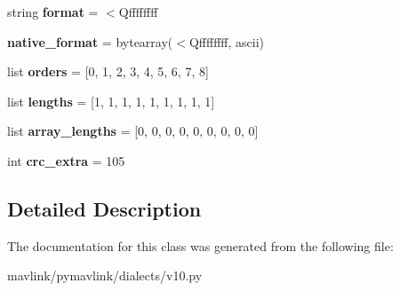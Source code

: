 \begin{DoxyCompactItemize}
\mbox{\label{classpymavlink_1_1dialects_1_1v10_1_1MAVLink__wind__cov__message_a94e3a05002052bcd2541877545a1d447}} 
string {\bfseries format} = \textquotesingle{}$<$Qffffffff\textquotesingle{}
\item 
\mbox{\label{classpymavlink_1_1dialects_1_1v10_1_1MAVLink__wind__cov__message_a9d62081563a8bb545bb20d6b3fa200c0}} 
{\bfseries native\+\_\+format} = bytearray(\textquotesingle{}$<$Qffffffff\textquotesingle{}, \textquotesingle{}ascii\textquotesingle{})
\item 
\mbox{\label{classpymavlink_1_1dialects_1_1v10_1_1MAVLink__wind__cov__message_a04a3cf70e7bc67df400119710d004f37}} 
list {\bfseries orders} = \mbox{[}0, 1, 2, 3, 4, 5, 6, 7, 8\mbox{]}
\item 
\mbox{\label{classpymavlink_1_1dialects_1_1v10_1_1MAVLink__wind__cov__message_a970d2b71e520a8302693309f84ca39b8}} 
list {\bfseries lengths} = \mbox{[}1, 1, 1, 1, 1, 1, 1, 1, 1\mbox{]}
\item 
\mbox{\label{classpymavlink_1_1dialects_1_1v10_1_1MAVLink__wind__cov__message_ae99a4dfc4f954b16077479dd3f9ca2c5}} 
list {\bfseries array\+\_\+lengths} = \mbox{[}0, 0, 0, 0, 0, 0, 0, 0, 0\mbox{]}
\item 
\mbox{\label{classpymavlink_1_1dialects_1_1v10_1_1MAVLink__wind__cov__message_a828991d9ee6f6dc59611b238df0f6f30}} 
int {\bfseries crc\+\_\+extra} = 105
\end{DoxyCompactItemize}


\subsection{Detailed Description}
\begin{DoxyVerb}\end{DoxyVerb}
 

The documentation for this class was generated from the following file\+:\begin{DoxyCompactItemize}
\item 
mavlink/pymavlink/dialects/v10.\+py\end{DoxyCompactItemize}

